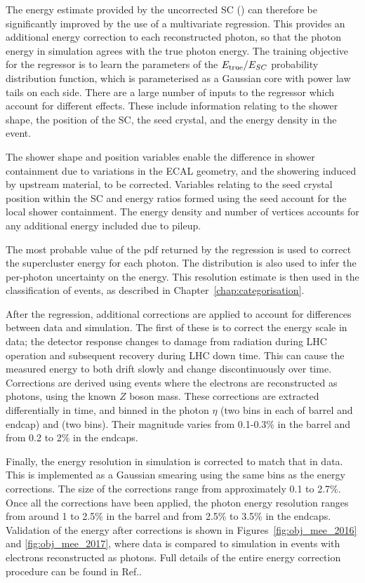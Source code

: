 The energy estimate provided by the uncorrected SC (\Eraw) can therefore be significantly improved by the use of a multivariate regression.
This provides an additional energy correction to each reconstructed photon, so that the photon energy in simulation agrees with the true photon energy.
The training objective for the regressor is to learn the parameters of the $E_{\mathrm{true}}/E_{SC}$ probability distribution function, 
which is parameterised as a Gaussian core with power law tails on each side. %
There are a large number of inputs to the regressor which account for different effects.
These include information relating to the shower shape, the position of the SC, the seed crystal, and the energy density in the event.

The shower shape and position variables enable the difference in shower containment due to variations in the ECAL geometry, 
and the showering induced by upstream material, to be corrected.
Variables relating to the seed crystal position within the SC and energy ratios formed using the seed account for the local shower containment.
The energy density and number of vertices accounts for any additional energy included due to pileup.

The most probable value of the pdf returned by the regression is used to correct the supercluster energy for each photon.
The distribution is also used to infer the per-photon uncertainty on the energy.
This resolution estimate is then used in the classification of events, as described in Chapter~\ref{chap:categorisation}.

After the regression, additional corrections are applied to account for differences between data and simulation.
The first of these is to correct the energy scale in data;
the detector response changes to damage from radiation during LHC operation and subsequent recovery during LHC down time.
This can cause the measured energy to both drift slowly and change discontinuously over time.
Corrections are derived using \Zee events where the electrons are reconstructed as photons, using the known $Z$ boson mass.
These corrections are extracted differentially in time, and binned in the photon $\eta$ (two bins in each of barrel and endcap) and \RNINE (two bins).
Their magnitude varies from 0.1-0.3\% in the barrel and from 0.2 to 2\% in the endcaps.

Finally, the energy resolution in simulation is corrected to match that in data.
This is implemented as a Gaussian smearing using the same bins as the energy corrections.
The size of the corrections range from approximately 0.1 to 2.7\%.
Once all the corrections have been applied, the photon energy resolution ranges from around 1 to 2.5\% in the barrel
and from 2.5\% to 3.5\% in the endcaps.
Validation of the energy after corrections is shown in Figures~\ref{fig:obj_mee_2016} and \ref{fig:obj_mee_2017}, 
where data is compared to simulation in \Zee events with electrons reconstructed as photons.
Full details of the entire energy correction procedure can be found in Ref.\cite{PhotonReco}.


